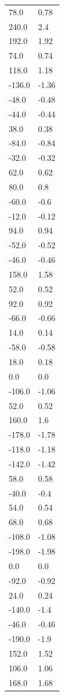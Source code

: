 \begin{longtable}{ll}
78.0 & 0.78 \\
240.0 & 2.4 \\
192.0 & 1.92 \\
74.0 & 0.74 \\
118.0 & 1.18 \\
-136.0 & -1.36 \\
-48.0 & -0.48 \\
-44.0 & -0.44 \\
38.0 & 0.38 \\
-84.0 & -0.84 \\
-32.0 & -0.32 \\
62.0 & 0.62 \\
80.0 & 0.8 \\
-60.0 & -0.6 \\
-12.0 & -0.12 \\
94.0 & 0.94 \\
-52.0 & -0.52 \\
-46.0 & -0.46 \\
158.0 & 1.58 \\
52.0 & 0.52 \\
92.0 & 0.92 \\
-66.0 & -0.66 \\
14.0 & 0.14 \\
-58.0 & -0.58 \\
18.0 & 0.18 \\
0.0 & 0.0 \\
-106.0 & -1.06 \\
52.0 & 0.52 \\
160.0 & 1.6 \\
-178.0 & -1.78 \\
-118.0 & -1.18 \\
-142.0 & -1.42 \\
58.0 & 0.58 \\
-40.0 & -0.4 \\
54.0 & 0.54 \\
68.0 & 0.68 \\
-108.0 & -1.08 \\
-198.0 & -1.98 \\
0.0 & 0.0 \\
-92.0 & -0.92 \\
24.0 & 0.24 \\
-140.0 & -1.4 \\
-46.0 & -0.46 \\
-190.0 & -1.9 \\
152.0 & 1.52 \\
106.0 & 1.06 \\
168.0 & 1.68 \\

\end{longtable}
